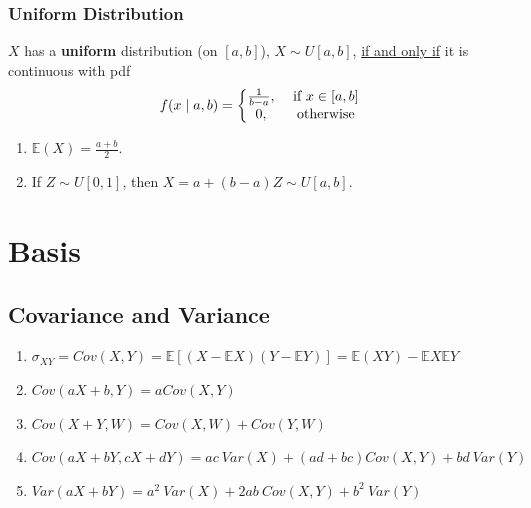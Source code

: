 \documentclass[11pt]{elegantbook}
\begin{document}
\subsection{Uniform Distribution}
\begin{definition}
    \normalfont
    $X$ has a \textbf{uniform} distribution (on $[a,b]$), $X\sim U[a,b]$, \underline{if and only if} it is continuous with pdf
    \begin{equation}
        \begin{aligned}
            f(x\mid a,b)=\left\{\begin{matrix}
                \frac{1}{b-a},& \textnormal{ if }x\in [a,b]\\
                0,& \textnormal{ otherwise}
            \end{matrix}\right.
        \end{aligned}
        \nonumber
    \end{equation}
\end{definition}
\begin{enumerate}[$\circ$]
    \item $\mathbb{E}(X)=\frac{a+b}{2}$.
    \item If $Z\sim U[0,1]$, then $X=a+(b-a)Z\sim U[a,b]$.
\end{enumerate}


\chapter{Basis}
\section{Covariance and Variance}
\begin{enumerate}[(1)]
    \item $\sigma_{XY}=Cov(X,Y)=\mathbb{E}\left[(X-\mathbb{E}X)(Y-\mathbb{E}Y)\right]=\mathbb{E}(XY)-\mathbb{E}X\mathbb{E}Y$
    \item $Cov(aX+b,Y)=aCov(X,Y)$
    \item $Cov(X+Y,W)=Cov(X,W)+Cov(Y,W)$
    \item $Cov(aX+bY,cX+dY)=ac\ {Var}(X)+(ad+bc)Cov(X,Y)+bd\ {Var}(Y)$
    \item $Var(aX+bY)=a^2\ {Var}(X)+2ab\ Cov(X,Y)+b^2\ {Var}(Y)$
\end{enumerate}
\end{document}
